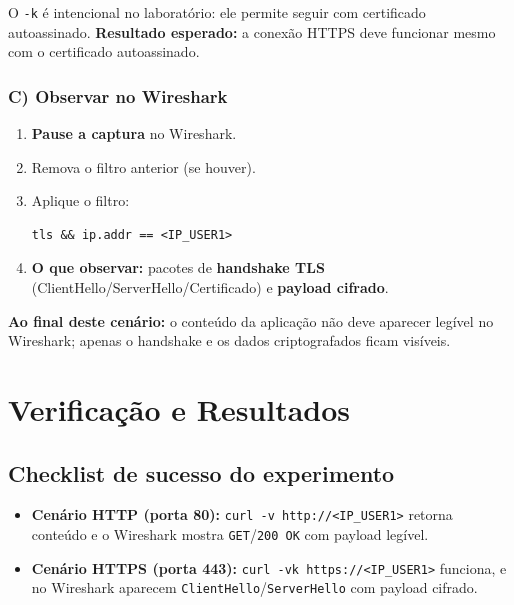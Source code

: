 \begin{notebox}
O \texttt{-k} é intencional no laboratório: ele permite seguir com certificado autoassinado. \textbf{Resultado esperado:} a conexão HTTPS deve funcionar mesmo com o certificado autoassinado.
\end{notebox}


\subsubsection*{C) Observar no Wireshark}

\begin{enumerate}
\item \textbf{Pause a captura} no Wireshark.
\item Remova o filtro anterior (se houver).
\item Aplique o filtro:
\begin{lstlisting}
tls && ip.addr == <IP_USER1>
\end{lstlisting}
\item \textbf{O que observar:} pacotes de \textbf{handshake TLS} (ClientHello/ServerHello/Certificado) e \textbf{payload cifrado}.
\end{enumerate}


\begin{notebox}
\textbf{Ao final deste cenário:} o conteúdo da aplicação não deve aparecer legível no Wireshark; apenas o handshake e os dados criptografados ficam visíveis.
\end{notebox}

\section{Verificação e Resultados}

\subsection{Checklist de sucesso do experimento}

\begin{itemize}
  \item \textbf{Cenário HTTP (porta 80):} \texttt{curl -v http://<IP\_USER1>} retorna conteúdo e o Wireshark mostra \texttt{GET}/\texttt{200 OK} com payload legível.
  \item \textbf{Cenário HTTPS (porta 443):} \texttt{curl -vk https://<IP\_USER1>} funciona, e no Wireshark aparecem \texttt{ClientHello}/\texttt{ServerHello} com payload cifrado.
\end{itemize}

